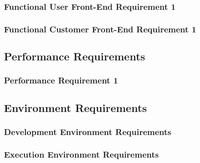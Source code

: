 \documentclass{article}
\begin{document}
\subsubsection{Functional User Front-End Requirement 1}
\label{func-user-front-end-1}


\subsubsection{Functional Customer Front-End Requirement 1}
\label{func-cust-front-end-1}


\subsection{Performance Requirements}
\subsubsection{Performance Requirement 1}
\subsection{Environment Requirements}
\subsubsection{Development Environment Requirements}
\subsubsection{Execution Environment Requirements}
\end{document}
